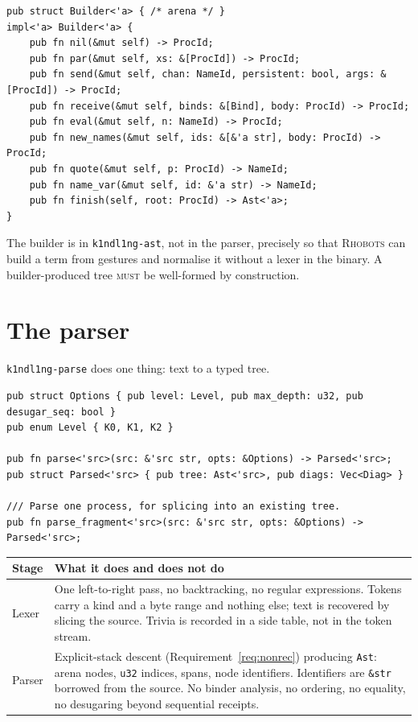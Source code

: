 \documentclass[11pt,a4paper]{article}
\newcommand{\code}[1]{\texttt{#1}}
\newcommand{\Rhobots}{\textsc{Rhobots}}
\newcommand{\MUST}{\textsc{must}}
\theoremstyle{definition}
\theoremstyle{plain}
\begin{document}
\begin{lstlisting}
pub struct Builder<'a> { /* arena */ }
impl<'a> Builder<'a> {
    pub fn nil(&mut self) -> ProcId;
    pub fn par(&mut self, xs: &[ProcId]) -> ProcId;
    pub fn send(&mut self, chan: NameId, persistent: bool, args: &[ProcId]) -> ProcId;
    pub fn receive(&mut self, binds: &[Bind], body: ProcId) -> ProcId;
    pub fn eval(&mut self, n: NameId) -> ProcId;
    pub fn new_names(&mut self, ids: &[&'a str], body: ProcId) -> ProcId;
    pub fn quote(&mut self, p: ProcId) -> NameId;
    pub fn name_var(&mut self, id: &'a str) -> NameId;
    pub fn finish(self, root: ProcId) -> Ast<'a>;
}
\end{lstlisting}

The builder is in \code{k1ndl1ng-ast}, not in the parser, precisely so that
\Rhobots{} can build a term from gestures and normalise it without a lexer in
the binary. A builder-produced tree \MUST{} be well-formed by construction.
\section{The parser}\label{sec:parse}

\code{k1ndl1ng-parse} does one thing: text to a typed tree.

\begin{lstlisting}
pub struct Options { pub level: Level, pub max_depth: u32, pub desugar_seq: bool }
pub enum Level { K0, K1, K2 }

pub fn parse<'src>(src: &'src str, opts: &Options) -> Parsed<'src>;
pub struct Parsed<'src> { pub tree: Ast<'src>, pub diags: Vec<Diag> }

/// Parse one process, for splicing into an existing tree.
pub fn parse_fragment<'src>(src: &'src str, opts: &Options) -> Parsed<'src>;
\end{lstlisting}

\begin{center}
\begin{tabularx}{\linewidth}{@{}l>{\raggedright\arraybackslash}X@{}}
\toprule
Stage & What it does and does not do\\
\midrule
Lexer & One left-to-right pass, no backtracking, no regular expressions. Tokens
carry a kind and a byte range and nothing else; text is recovered by slicing the
source. Trivia is recorded in a side table, not in the token stream.\\
Parser & Explicit-stack descent (Requirement~\ref{req:nonrec}) producing
\code{Ast}: arena nodes, \code{u32} indices, spans, node identifiers.
Identifiers are \code{\&str} borrowed from the source. No binder analysis, no
ordering, no equality, no desugaring beyond sequential receipts.\\
\bottomrule
\end{tabularx}
\end{center}
\end{document}
